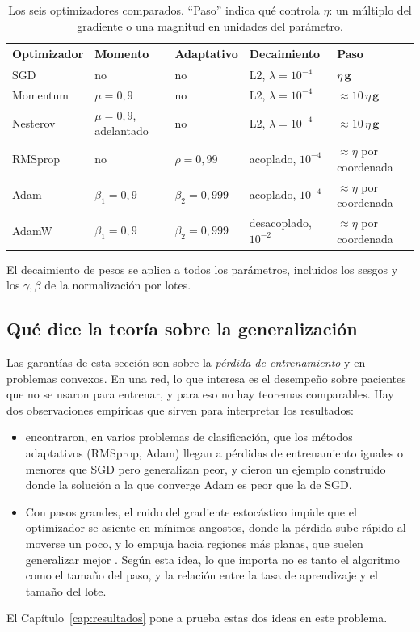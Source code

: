 \begin{table}[ht]
\centering
\caption{Los seis optimizadores comparados. ``Paso'' indica qué controla $\eta$: un múltiplo del gradiente o una magnitud en
unidades del parámetro.}
\label{tab:optimizadores}
\small
\begin{tabular}{lllll}
\toprule
Optimizador & Momento & Adaptativo & Decaimiento & Paso \\
\midrule
SGD      & no                    & no & L2, $\lambda = 10^{-4}$          & $\eta\,\mathbf{g}$ \\
Momentum & $\mu = 0{,}9$         & no & L2, $\lambda = 10^{-4}$          & $\approx 10\,\eta\,\mathbf{g}$ \\
Nesterov & $\mu = 0{,}9$, adelantado & no & L2, $\lambda = 10^{-4}$      & $\approx 10\,\eta\,\mathbf{g}$ \\
RMSprop  & no                    & $\rho = 0{,}99$ & acoplado, $10^{-4}$ & $\approx\eta$ por coordenada \\
Adam     & $\beta_1 = 0{,}9$     & $\beta_2 = 0{,}999$ & acoplado, $10^{-4}$ & $\approx\eta$ por coordenada \\
AdamW    & $\beta_1 = 0{,}9$     & $\beta_2 = 0{,}999$ & desacoplado, $10^{-2}$ & $\approx\eta$ por coordenada \\
\bottomrule
\end{tabular}
\end{table}

El decaimiento de pesos se aplica a todos los parámetros, incluidos los sesgos y los $\gamma, \beta$ de la normalización por
lotes.

\subsection{Qué dice la teoría sobre la generalización}

Las garantías de esta sección son sobre la \emph{pérdida de entrenamiento} y en problemas convexos. En una red, lo que
interesa es el desempeño sobre pacientes que no se usaron para entrenar, y para eso no hay teoremas comparables. Hay dos
observaciones empíricas que sirven para interpretar los resultados:
\begin{itemize}
  \item \textcite{wilson2017} encontraron, en varios problemas de clasificación, que los métodos adaptativos (RMSprop, Adam)
        llegan a pérdidas de entrenamiento iguales o menores que SGD pero generalizan peor, y dieron un ejemplo construido
        donde la solución a la que converge Adam es peor que la de SGD.
  \item Con pasos grandes, el ruido del gradiente estocástico impide que el optimizador se asiente en mínimos angostos, donde
        la pérdida sube rápido al moverse un poco, y lo empuja hacia regiones más planas, que suelen generalizar mejor
        \parencite{goodfellow2016}. Según esta idea, lo que importa no es tanto el algoritmo como el tamaño del paso, y la
        relación entre la tasa de aprendizaje y el tamaño del lote.
\end{itemize}
El Capítulo~\ref{cap:resultados} pone a prueba estas dos ideas en este problema.

